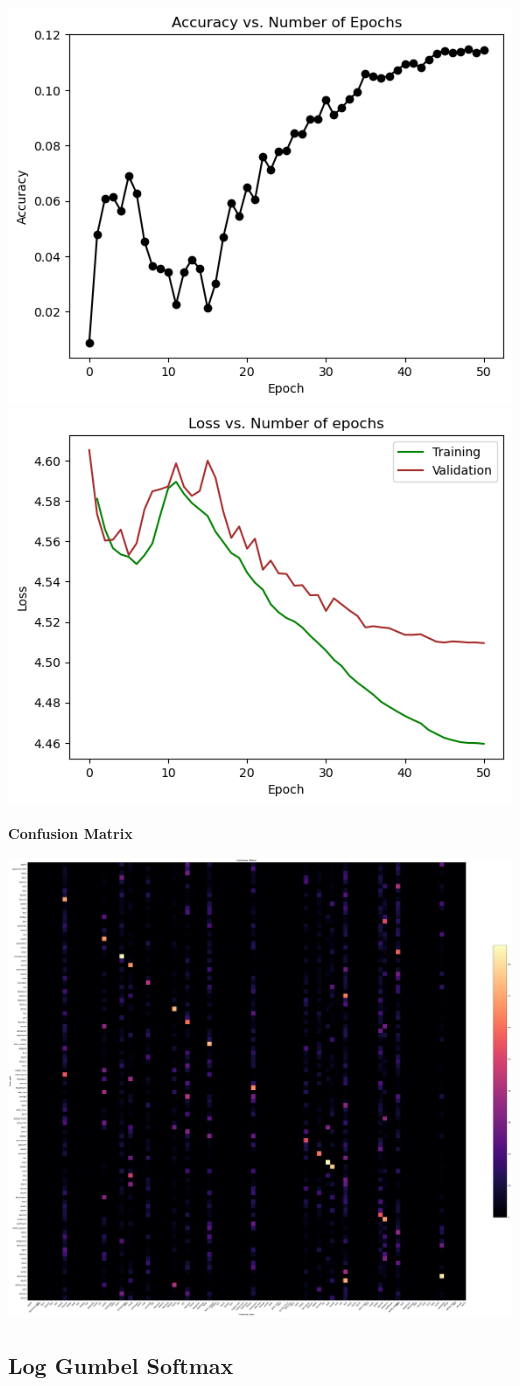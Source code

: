 \documentclass{article}
\begin{document}
        \includegraphics[width=0.5\linewidth]{images/GumbelSoftmax/gumbel-acc-epoch.png}
        \includegraphics[width=0.5\linewidth]{images/GumbelSoftmax/gumbel-loss-epoch.png}

\textbf{Confusion Matrix}

\includegraphics[width=0.9\linewidth]{images/GumbelSoftmax/gumbel-cm.png}



\subsection{Log Gumbel Softmax}
\end{document}
